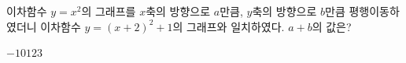 이차함수 $y=x^2$의 그래프를 $x$축의 방향으로 $a$만큼, $y$축의 방향으로 $b$만큼 평행이동하였더니 이차함수 $y=(x+2)^2+1$의 그래프와 일치하였다. $a+b$의 값은?
\begin{choices32}{$-1$}{$0$}{$1$}{$2$}{$3$}\end{choices32}
